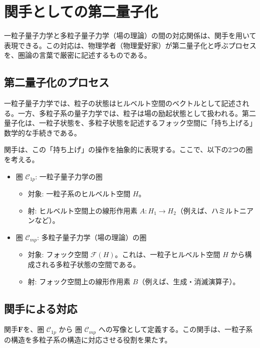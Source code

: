 \documentclass[uplatex,a4j,12pt,dvipdfmx]{jsarticle}
\begin{document}
\section{関手としての第二量子化}

一粒子量子力学と多粒子量子力学（場の理論）の間の対応関係は、関手を用いて表現できる。この対応は、物理学者（物理愛好家）が第二量子化と呼ぶプロセスを、圏論の言葉で厳密に記述するものである。

\subsection{第二量子化のプロセス}

一粒子量子力学では、粒子の状態はヒルベルト空間のベクトルとして記述される。一方、多粒子系の量子力学では、粒子は場の励起状態として扱われる。第二量子化は、一粒子状態を、多粒子状態を記述するフォック空間に「持ち上げる」数学的な手続きである。

関手は、この「持ち上げ」の操作を抽象的に表現する。ここで、以下の2つの圏を考える。

\begin{itemize}
	\item 圏 $\mathcal{C}_{1p}$: 一粒子量子力学の圏
	      \begin{itemize}
		      \item 対象: 一粒子系のヒルベルト空間 $H$。
		      \item 射: ヒルベルト空間上の線形作用素 $A: H_1 \to H_2$（例えば、ハミルトニアンなど）。
	      \end{itemize}

	\item 圏 $\mathcal{C}_{mp}$: 多粒子量子力学（場の理論）の圏
	      \begin{itemize}
		      \item 対象: フォック空間 $\mathcal{F}(H)$。これは、一粒子ヒルベルト空間 $H$ から構成される多粒子状態の空間である。
		      \item 射: フォック空間上の線形作用素 $B$（例えば、生成・消滅演算子）。
	      \end{itemize}
\end{itemize}

\subsection{関手による対応}

関手$\mathbf{F}$を、圏 $\mathcal{C}_{1p}$ から 圏 $\mathcal{C}_{mp}$ への写像として定義する。この関手は、一粒子系の構造を多粒子系の構造に対応させる役割を果たす。
\end{document}
